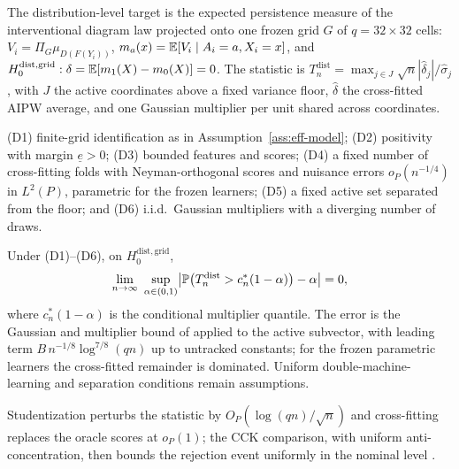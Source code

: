 The distribution-level target is the expected persistence measure of the interventional diagram law projected onto one frozen grid $G$ of $q=32\times32$ cells: $V_i=\Pi_G\mu_{D(F(Y_i))}$, $m_a(x)=\mathbb{E}[V_i\mid A_i=a,X_i=x]$, and $H_0^{\mathrm{dist,grid}}:\delta=\mathbb{E}[m_1(X)-m_0(X)]=0$. The statistic is $T_n^{\mathrm{dist}}=\max_{j\in J}\sqrt n|\hat\delta_j|/\hat\sigma_j$, with $J$ the active coordinates above a fixed variance floor, $\hat\delta$ the cross-fitted AIPW average, and one Gaussian multiplier per unit shared across coordinates.

\begin{assumption}
\label{ass:dist-model}
(D1) finite-grid identification as in Assumption~\ref{ass:eff-model}; (D2) positivity with margin $\underline e>0$; (D3) bounded features and scores; (D4) a fixed number of cross-fitting folds with Neyman-orthogonal scores and nuisance errors $o_P(n^{-1/4})$ in $L^2(P)$, parametric for the frozen learners; (D5) a fixed active set separated from the floor; and (D6) i.i.d.\ Gaussian multipliers with a diverging number of draws.
\end{assumption}

\begin{theorem}
\label{thm:dist-validity}
Under (D1)--(D6), on $H_0^{\mathrm{dist,grid}}$,
\[
\lim_{n\to\infty}\ \sup_{\alpha\in(0,1)}\bigl|\Prob\bigl(T_n^{\mathrm{dist}}>c_n^*(1-\alpha)\bigr)-\alpha\bigr|=0,
\]
where $c_n^*(1-\alpha)$ is the conditional multiplier quantile. The error is the Gaussian and multiplier bound of \citet{cck_2013} applied to the active subvector, with leading term $B\,n^{-1/8}\log^{7/8}(qn)$ up to untracked constants; for the frozen parametric learners the cross-fitted remainder is dominated. Uniform double-machine-learning and separation conditions remain assumptions.
\end{theorem}
Studentization perturbs the statistic by $O_P(\log(qn)/\sqrt n)$ and cross-fitting replaces the oracle scores at $o_P(1)$; the CCK comparison, with uniform anti-concentration, then bounds the rejection event uniformly in the nominal level \cite{chernozhukov_dml_2018,new_robins_2018}.

